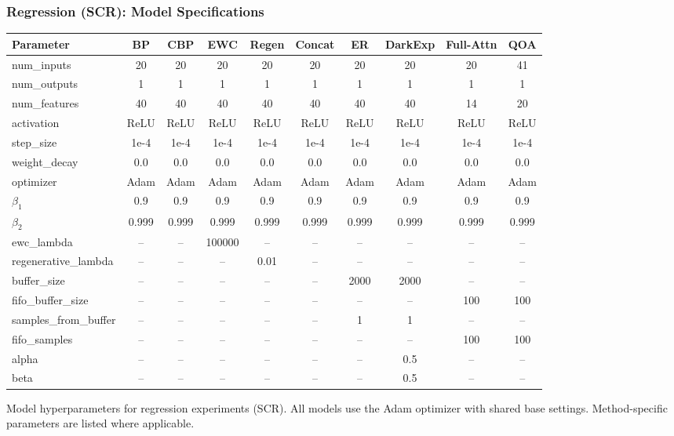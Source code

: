 \documentclass{article}
\begin{document}
\subsubsection{Regression (SCR): Model Specifications}
\label{sec:scr_model_specs}

\vspace{2mm}
\noindent
\begin{minipage}{\columnwidth}
\centering
\footnotesize
\setlength{\tabcolsep}{3pt}

\begin{tabular}{lccccccccc}
\toprule
\textbf{Parameter} & \textbf{BP} & \textbf{CBP} & \textbf{EWC} & \textbf{Regen} & \textbf{Concat} & \textbf{ER} & \textbf{DarkExp} & \textbf{Full-Attn} & \textbf{QOA} \\
\midrule
num\_inputs        & 20 & 20 & 20 & 20 & 20 & 20 & 20 & 20 & 41 \\
num\_outputs       & 1  & 1  & 1  & 1  & 1  & 1  & 1  & 1  & 1 \\
num\_features      & 40 & 40 & 40 & 40 & 40 & 40 & 40 & 14 & 20 \\
activation         & ReLU & ReLU & ReLU & ReLU & ReLU & ReLU & ReLU & ReLU & ReLU \\
step\_size         & 1e-4 & 1e-4 & 1e-4 & 1e-4 & 1e-4 & 1e-4 & 1e-4 & 1e-4 & 1e-4 \\
weight\_decay      & 0.0 & 0.0 & 0.0 & 0.0 & 0.0 & 0.0 & 0.0 & 0.0 & 0.0 \\
\midrule
optimizer          & Adam & Adam & Adam & Adam & Adam & Adam & Adam & Adam & Adam \\
$\beta_1$          & 0.9 & 0.9 & 0.9 & 0.9 & 0.9 & 0.9 & 0.9 & 0.9 & 0.9 \\
$\beta_2$          & 0.999 & 0.999 & 0.999 & 0.999 & 0.999 & 0.999 & 0.999 & 0.999 & 0.999 \\
\midrule
ewc\_lambda        & -- & -- & 100000 & -- & -- & -- & -- & -- & -- \\
regenerative\_lambda & -- & -- & -- & 0.01 & -- & -- & -- & -- & -- \\
\midrule
buffer\_size       & -- & -- & -- & -- & -- & 2000 & 2000 & -- & -- \\
fifo\_buffer\_size & -- & -- & -- & -- & -- & -- & -- & 100 & 100 \\
samples\_from\_buffer & -- & -- & -- & -- & -- & 1 & 1 & -- & -- \\
fifo\_samples      & -- & -- & -- & -- & -- & -- & -- & 100 & 100 \\
\midrule
alpha              & -- & -- & -- & -- & -- & -- & 0.5 & -- & -- \\
beta               & -- & -- & -- & -- & -- & -- & 0.5 & -- & -- \\
\bottomrule
\end{tabular}

\caption{Model hyperparameters for regression experiments (SCR). All models use the Adam optimizer with shared base settings. Method-specific parameters are listed where applicable.}
\label{tab:scr_model_specs}

\end{minipage}
\end{document}
